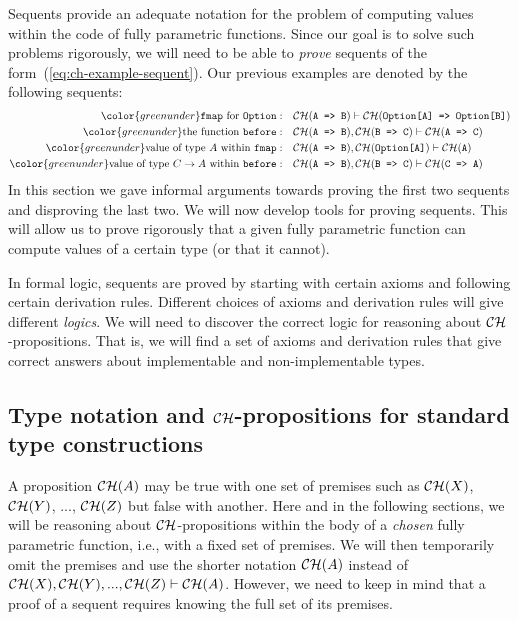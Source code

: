 Sequents provide an adequate notation for the problem of computing
values within the code of fully parametric functions. Since our goal
is to solve such problems rigorously, we will need to be able to \emph{prove}
sequents of the form~(\ref{eq:ch-example-sequent}). Our previous
examples are denoted by the following sequents:
\begin{align*}
{\color{greenunder}\text{\texttt{fmap} for \texttt{Option}}:}\quad & {\cal CH}(\text{\texttt{A => B}})\vdash{\cal CH}(\text{\texttt{Option[A] => Option[B]}})\\
{\color{greenunder}\text{the function \texttt{before}}:}\quad & {\cal CH}(\text{\texttt{A => B}}),{\cal CH}(\text{\texttt{B => C}})\vdash{\cal CH}(\text{\texttt{A => C}})\\
{\color{greenunder}\text{value of type }A\text{ within \texttt{fmap}}:}\quad & {\cal CH}(\text{\texttt{A => B}}),{\cal CH}(\text{\texttt{Option[A]}})\vdash{\cal CH}(\text{\texttt{A}})\\
{\color{greenunder}\text{value of type }C\rightarrow A\text{ within \texttt{before}}:}\quad & {\cal CH}(\text{\texttt{A => B}}),{\cal CH}(\text{\texttt{B => C}})\vdash{\cal CH}(\text{\texttt{C => A}})
\end{align*}
In this section we gave informal arguments towards proving the first
two sequents and disproving the last two. We will now develop tools
for proving sequents. This will allow us to prove rigorously that
a given fully parametric function can compute values of a certain
type (or that it cannot).

In formal logic, sequents are proved by starting
with certain axioms and following certain derivation rules. Different
choices of axioms and derivation rules will give different \emph{logics}.
We will need to discover the correct logic for reasoning about ${\cal CH}$-propositions.
That is, we will find a set of axioms and derivation rules that give
correct answers about implementable and non-implementable types.

\subsection{Type notation and ${\cal CH}$-propositions for standard type constructions\label{subsec:Type-notation-and-standard-type-constructions}}

A proposition ${\cal CH}(A)$ may be true with one set of premises
such as ${\cal CH}(X)$, ${\cal CH}(Y)$, ..., ${\cal CH}(Z)$ but
false with another. Here and in the following sections, we will be
reasoning about ${\cal CH}$-propositions within the body of a \emph{chosen}
fully parametric function, i.e., with a fixed set of premises. We
will then temporarily omit the premises and use the shorter notation
${\cal CH}(A)$ instead of ${\cal CH}(X),{\cal CH}(Y),...,{\cal CH}(Z)\vdash{\cal CH}(A)$.
However, we need to keep in mind that a proof of a sequent requires
knowing the full set of its premises.

